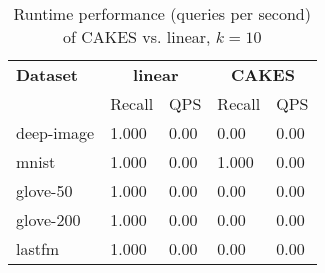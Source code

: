 \begin{table*}[!t]
    \caption{Runtime performance (queries per second) of CAKES vs. linear, $k=10$}
    \label{table:results:ann-alt-10}
    \vskip 0.15in
    \begin{center}
    \begin{small}
    \begin{sc}
    \begin{tabular}{|l|l|l|l|l|}
    \textbf{Dataset}  & \multicolumn{2}{|c|}{\textbf{linear}} & \multicolumn{2}{|c|}{\textbf{CAKES}}  \\
    &                    Recall & QPS                           & Recall & QPS                           \\
    \hline
    deep-image             & 1.000 & 0.00                           & 0.00 & 0.00      \\
    \hline
    mnist                   & 1.000 & 0.00                          & 1.000 & 0.00      \\
    \hline
    glove-50               & 1.000 & 0.00                           & 0.00 & 0.00      \\
    \hline 
    glove-200              & 1.000 & 0.00                           & 0.00 & 0.00     \\
    \hline
    lastfm                 & 1.000 & 0.00                           & 0.00 & 0.00           \\
    \hline
    \end{tabular}
    \end{sc}
    \end{small}
    \end{center}
    \vskip -0.1in
    \end{table*}


